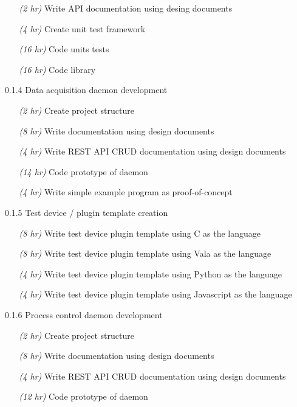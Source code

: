 \documentclass[11pt]{article}
\begin{document}
\begin{itemize}
\begin{itemize}
            \item[\emph{(2 hr)}] Write API documentation using desing documents
            \item[\emph{(4 hr)}] Create unit test framework
            \item[\emph{(16 hr)}] Code units tests
            \item[\emph{(16 hr)}] Code library
          \end{itemize}
        \item[0.1.4] Data acquisition daemon development
          \begin{itemize}
            \item[\emph{(2 hr)}] Create project structure
            \item[\emph{(8 hr)}] Write documentation using design documents
            \item[\emph{(4 hr)}] Write REST API CRUD documentation using design documents
            \item[\emph{(14 hr)}] Code prototype of daemon
            \item[\emph{(4 hr)}] Write simple example program as proof-of-concept
          \end{itemize}
        \item[0.1.5] Test device / plugin template creation
          \begin{itemize}
            \item[\emph{(8 hr)}] Write test device plugin template using C as the language
            \item[\emph{(8 hr)}] Write test device plugin template using Vala as the language
            \item[\emph{(4 hr)}] Write test device plugin template using Python as the language
            \item[\emph{(4 hr)}] Write test device plugin template using Javascript as the language
          \end{itemize}
        \item[0.1.6] Process control daemon development
          \begin{itemize}
            \item[\emph{(2 hr)}] Create project structure
            \item[\emph{(8 hr)}] Write documentation using design documents
            \item[\emph{(4 hr)}] Write REST API CRUD documentation using design documents
            \item[\emph{(12 hr)}] Code prototype of daemon

\end{itemize}
\end{itemize}
\end{document}
